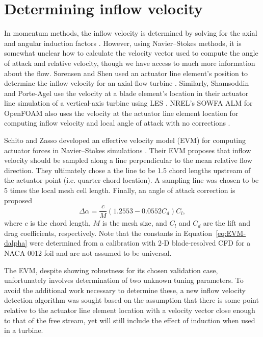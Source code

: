 \section{Determining inflow velocity}

In momentum methods, the inflow velocity is determined by solving for the axial
and angular induction factors \cite{Manwell2002}. However, using Navier--Stokes
methods, it is somewhat unclear how to calculate the velocity vector used to
compute the angle of attack and relative velocity, though we have access to much
more information about the flow. Sorensen and Shen used an actuator line
element's position to determine the inflow velocity for an axial-flow turbine
\cite{Sorensen2002}. Similarly, Shamsoddin and Porte-Agel use the velocity at a
blade element's location in their actuator line simulation of a vertical-axis
turbine using LES \cite{Shamsoddin2014}. NREL's SOWFA ALM for OpenFOAM also uses
the velocity at the actuator line element location for computing inflow velocity
and local angle of attack with no corrections \cite{Churchfield2013}.

Schito and Zasso developed an effective velocity model (EVM) for computing
actuator forces in Navier--Stokes simulations \cite{Schito2014}. Their EVM
proposes that inflow velocity should be sampled along a line perpendicular to
the mean relative flow direction. They ultimately chose a the line to be 1.5
chord lengths upstream of the actuator point (i.e. quarter-chord location). A
sampling line was chosen to be 5 times the local mesh cell length. Finally, an
angle of attack correction is proposed
\begin{equation}
    \Delta \alpha = \frac{c}{M} (1.2553 - 0.0552 C_d) C_l,
    \label{eq:EVM-dalpha}
\end{equation}
where $c$ is the chord length, $M$ is the mesh size, and $C_l$ and $C_d$ are the
lift and drag coefficients, respectively. Note that the constants in
Equation~\ref{eq:EVM-dalpha} were determined from a calibration with 2-D
blade-resolved CFD for a NACA 0012 foil and are not assumed to be universal.

The EVM, despite showing robustness for its chosen validation case,
unfortunately involves determination of two unknown tuning parameters. To avoid
the additional work necessary to determine these, a new inflow velocity
detection algorithm was sought based on the assumption that there is some point
relative to the actuator line element location with a velocity vector close
enough to that of the free stream, yet will still include the effect of
induction when used in a turbine.


